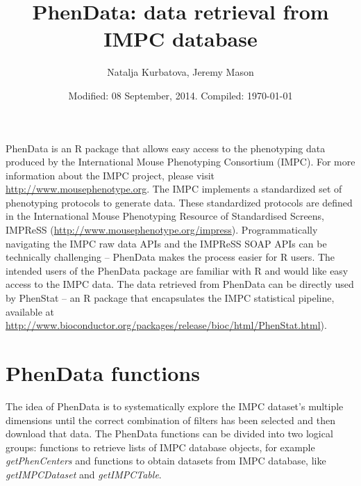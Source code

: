 \documentclass[a4paper]{article}
\begin{document}



\title{PhenData: data retrieval from IMPC database}
\author{Natalja Kurbatova, Jeremy Mason}
\date{Modified: 08 September, 2014. Compiled: \today}

\maketitle
PhenData is an R package that allows easy access to the phenotyping data produced by the International Mouse 
Phenotyping Consortium (IMPC).  For more information about the IMPC project, please visit 
\url{http://www.mousephenotype.org}.   
\newline\newline
The IMPC implements a standardized set of phenotyping protocols to generate data. These standardized protocols are 
defined in the International Mouse Phenotyping Resource of Standardised Screens,
IMPReSS (\url{http://www.mousephenotype.org/impress}).  Programmatically navigating the IMPC raw data APIs and 
the IMPReSS SOAP APIs can be technically challenging -- PhenData makes the process easier for R users. 
\newline\newline
The intended users of the PhenData package are familiar with R and would like easy access to the IMPC data. The data 
retrieved from PhenData can be directly used by PhenStat -- an R package that encapsulates the IMPC statistical 
pipeline, available at \url{http://www.bioconductor.org/packages/release/bioc/html/PhenStat.html}).

\section*{PhenData functions}
The idea of PhenData is to systematically explore the IMPC dataset's multiple dimensions until the correct 
combination of filters has been selected and then download that data.
\newline\newline
The PhenData functions can be divided into two logical groups: functions to retrieve lists of IMPC database objects, for example \textit{getPhenCenters} and functions to obtain datasets from IMPC database, like \textit{getIMPCDataset} and \textit{getIMPCTable}. 
\end{document}
